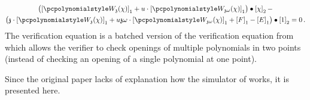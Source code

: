 \let\accentvec\vec \documentclass[runningheads]{llncs}
\begin{document}
\begin{description}
\begin{multline}
		\label{eq:ver_eq}
		\left(
		\gone{\p{W_{\chz}}(\chi)} + u \cdot \gone{\p{W_{\chz \omega}}(\chi)}
		\right) \bullet
		\gtwo{\chi} - \\
		\left(
			\chz \cdot \gone{\p{W_{\chz}}(\chi)} + u \chz \omega \cdot \gone{\p{W_{\chz \omega}}(\chi)} + \gone{F} - \gone{E}
		\right) \bullet
		\gtwo{1} = 0\,.
	\end{multline}
  The verification equation is a batched version of the verification equation
  from \cite{AC:KatZavGol10} which allows the verifier to check openings of
  multiple polynomials in two points (instead of checking an opening of a single
  polynomial at one point).
\end{description}

Since the original paper \cite{EPRINT:GabWilCio19} lacks of explanation how the
simulator of \plonk{} works, it is presented here.
\end{document}

